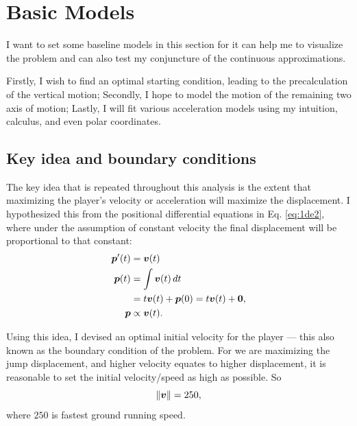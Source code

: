 
\section{Basic Models}
I want to set some baseline models in this section for it can help me to visualize the problem and can also test my conjuncture of the continuous approximations.

Firstly, I wish to find an optimal starting condition, leading to the precalculation of the vertical motion; Secondly, I hope to model the motion of the remaining two axis of motion; Lastly, I will fit various acceleration models using my intuition, calculus, and even polar coordinates.

\subsection{Key idea and boundary conditions}
The key idea that is repeated throughout this analysis is the extent that maximizing the player's velocity or acceleration will maximize the displacement. I hypothesized this from the positional differential equations in Eq. \ref{eq:1de2}, where under the assumption of constant velocity the final displacement will be proportional to that constant:
\begin{align*}
    \boldsymbol{p}'(t) &= \boldsymbol{v}(t)\\
    \boldsymbol{p}(t) &= \int \boldsymbol{v}(t) \, dt\\
    &= t\boldsymbol{v}(t) + \boldsymbol{p}(0) = t\boldsymbol{v}(t) + \boldsymbol{0},\\
    \boldsymbol{p} &\propto \boldsymbol{v}(t).
\end{align*}

Using this idea, I devised an optimal initial velocity for the player --- this also known as the boundary condition of the problem. For we are maximizing the jump displacement, and higher velocity equates to higher displacement, it is reasonable to set the initial velocity/speed as high as possible. So
\[
    \|\boldsymbol{v}\| = 250,
\]
where $250$ is fastest ground running speed.


